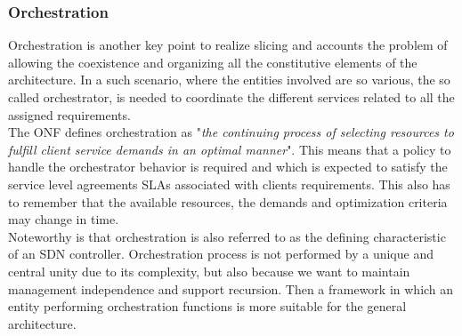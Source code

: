 \documentclass[a4paper,12pt]{report} %
\begin{document}
\subsubsection{Orchestration}
Orchestration is another key point to realize
slicing and accounts the problem of allowing the coexistence and organizing all the constitutive elements of the architecture.
In a such scenario, where the entities involved
are so various, the so called orchestrator, is needed to coordinate the different services related to all the assigned requirements.\\
The \gls{ONF} defines
orchestration as "\textit{the continuing process of
selecting resources to fulfill client service demands
in an optimal manner}". This means that a policy to handle the orchestrator behavior is required and which is expected to satisfy the service level agreements \gls{SLA}s associated with clients
requirements. This also has to remember
that the available resources, the demands and optimization criteria may change in time. \\
Noteworthy is that orchestration is also referred to as the defining
characteristic of an SDN controller. Orchestration process is not performed by a unique and central unity due to its complexity, but also because we want to maintain management independence and support recursion. Then a framework in which an entity performing orchestration functions is more suitable for the general architecture. \cite{ordonez2017network} \cite{marsch20185g} \cite{rostami2017orchestration}
\end{document}
